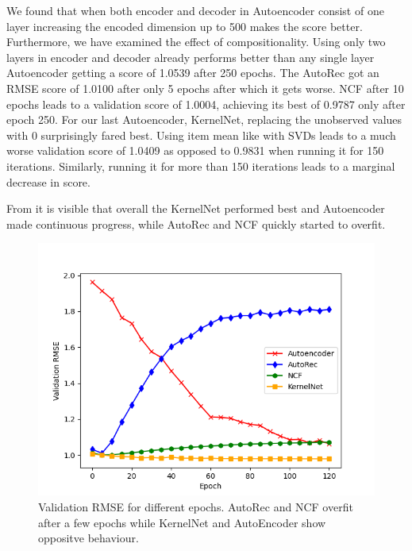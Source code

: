 \documentclass[10pt,conference,compsocconf]{IEEEtran}
\begin{document}
    We found that when both encoder and decoder in Autoencoder consist of one layer increasing the encoded dimension up to 500 makes
    the score better.
    Furthermore, we have examined the effect of compositionality.
    Using only two layers in encoder and decoder already performs better than any single layer Autoencoder getting a score of 1.0539 after 250 epochs.
    The AutoRec got an RMSE score of 1.0100 after only 5 epochs after which it gets worse.
    NCF after 10 epochs leads to a validation score of 1.0004, achieving its best of 0.9787 only after epoch 250.
    For our last Autoencoder, KernelNet, replacing the unobserved values with 0 surprisingly fared best.
    Using item mean like with SVDs leads to a much worse validation score of 1.0409 as opposed to 0.9831 when running it for 150 iterations.
    Similarly, running it for more than 150 iterations leads to a marginal decrease in score.

    From   it is visible that overall the KernelNet performed best and Autoencoder made continuous progress, while AutoRec and NCF quickly started to overfit.

    \begin{figure}
        \includegraphics[width=\columnwidth]{figures/validation_plot.png}
        \caption{Validation RMSE for different epochs.
        AutoRec and NCF overfit after a few epochs while KernelNet and AutoEncoder show oppositve behaviour.}
        \label{fig:validation}
    \end{figure}
\end{document}
